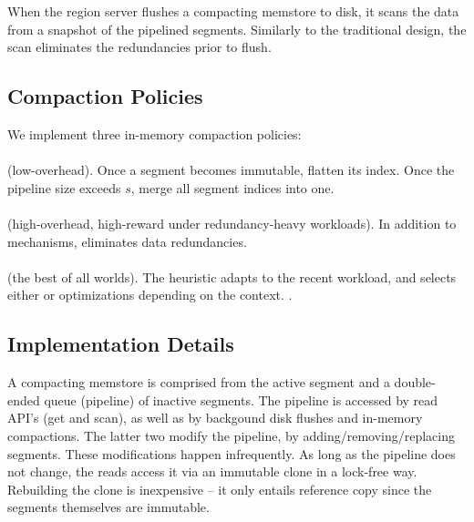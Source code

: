 When the region server flushes a compacting memstore to disk, it scans the data from a snapshot 
of the pipelined segments. Similarly to the traditional design, the scan eliminates the redundancies 
prior to flush. 
 

\subsection{Compaction Policies}
\label{sec:policies}

We implement three in-memory compaction policies: 
\paragraph{\basic} (low-overhead). Once a segment becomes immutable, flatten its index. Once the pipeline size exceeds $s$, 
merge all segment indices into one.  
\paragraph{\eager} (high-overhead, high-reward under redundancy-heavy workloads). 
In addition to \basic\/ mechanisms, eliminates data redundancies.
\paragraph{\adp} (the best of all worlds). The heuristic adapts to the recent workload, and selects either \basic\/ 
or \eager\/ optimizations depending on the context. . 

\subsection{Implementation Details}

A compacting memstore is comprised from the active segment and a double-ended queue (pipeline) of inactive segments. 
The pipeline is accessed by read API's (get and scan), as well as by backgound disk flushes and in-memory compactions. 
The latter two modify the pipeline, by adding/removing/replacing segments. These modifications happen infrequently. As 
long as the pipeline does not change, the reads access it via an immutable clone in a lock-free way. Rebuilding the clone
is inexpensive -- it only entails reference copy since the segments themselves are immutable. 

